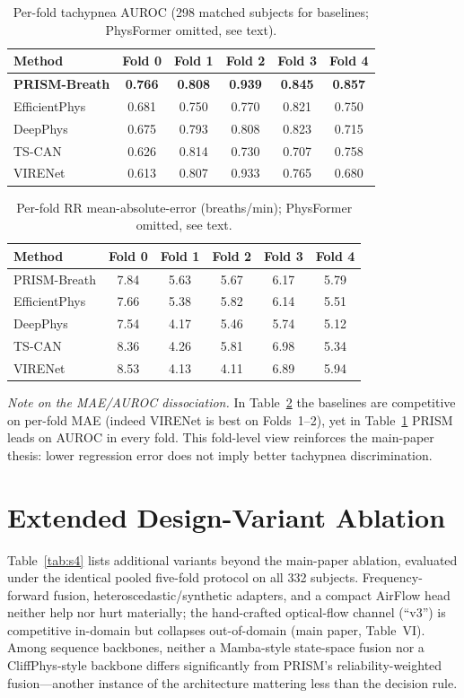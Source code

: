 \documentclass[journal]{IEEEtran}
\begin{document}
\begin{table}[!t]
\caption{Per-fold tachypnea AUROC (298 matched subjects for baselines; PhysFormer omitted, see text).}
\label{tab:s2}\centering\small
\begin{tabular}{@{}lccccc@{}}\toprule
Method & Fold 0 & Fold 1 & Fold 2 & Fold 3 & Fold 4\\\midrule
\textbf{PRISM-Breath} & \textbf{0.766} & \textbf{0.808} & \textbf{0.939} & \textbf{0.845} & \textbf{0.857} \\
EfficientPhys & 0.681 & 0.750 & 0.770 & 0.821 & 0.750 \\
DeepPhys & 0.675 & 0.793 & 0.808 & 0.823 & 0.715 \\
TS-CAN & 0.626 & 0.814 & 0.730 & 0.707 & 0.758 \\
VIRENet & 0.613 & 0.807 & 0.933 & 0.765 & 0.680 \\
\bottomrule
\end{tabular}
\end{table}

\begin{table}[!t]
\caption{Per-fold RR mean-absolute-error (breaths/min); PhysFormer omitted, see text.}
\label{tab:s3}\centering\small
\begin{tabular}{@{}lccccc@{}}\toprule
Method & Fold 0 & Fold 1 & Fold 2 & Fold 3 & Fold 4\\\midrule
PRISM-Breath & 7.84 & 5.63 & 5.67 & 6.17 & 5.79 \\
EfficientPhys & 7.66 & 5.38 & 5.82 & 6.14 & 5.51 \\
DeepPhys & 7.54 & 4.17 & 5.46 & 5.74 & 5.12 \\
TS-CAN & 8.36 & 4.26 & 5.81 & 6.98 & 5.34 \\
VIRENet & 8.53 & 4.13 & 4.11 & 6.89 & 5.94 \\
\bottomrule
\end{tabular}
\end{table}

\noindent\textit{Note on the MAE/AUROC dissociation.} In Table~\ref{tab:s3} the baselines are competitive
on per-fold MAE (indeed VIRENet is best on Folds~1--2), yet in Table~\ref{tab:s2} PRISM leads on AUROC in
every fold. This fold-level view reinforces the main-paper thesis: lower regression error does not imply
better tachypnea discrimination.

\section{Extended Design-Variant Ablation}
Table~\ref{tab:s4} lists additional variants beyond the main-paper ablation, evaluated under the identical
pooled five-fold protocol on all 332 subjects. Frequency-forward fusion, heteroscedastic/synthetic
adapters, and a compact AirFlow head neither help nor hurt materially; the hand-crafted optical-flow
channel (``v3'') is competitive in-domain but collapses out-of-domain (main paper, Table~VI). Among
sequence backbones, neither a Mamba-style state-space fusion nor a CliffPhys-style backbone differs
significantly from PRISM's reliability-weighted fusion---another instance of the architecture mattering
less than the decision rule.
\end{document}

